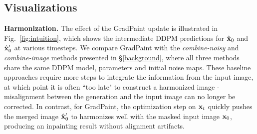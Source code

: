 






\subsection{Visualizations}

\noindent \textbf{Harmonization.} The effect of the GradPaint update is illustrated in Fig.~\ref{fig:intuition}, 
which shows the intermediate DDPM predictions for $\hat{\mathbf{x}}_0$ and $\hat{\mathbf{x}}_0'$ at various timesteps. We 
compare GradPaint with the \textit{combine-noisy} and \textit{combine-image} methods presented in \S\ref{background}, where all three methods share the same DDPM model, parameters and initial noise maps.
These baseline approaches require more steps to integrate the information from the input image, at which point it is often ``too late" to construct a harmonized image - misalignment between the generation and the input image can no longer be corrected. In contrast, for GradPaint, the optimization step on $\mathbf{x}_t$ quickly pushes the merged image $\hat{\mathbf{x}}_0'$ to harmonizes well with the masked input image $\mathbf{x}_0$, producing an inpainting result without alignment artifacts.

  

